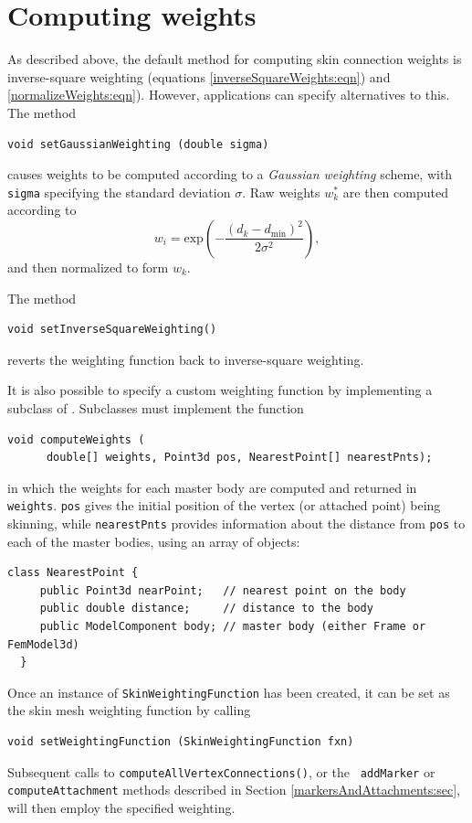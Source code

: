 \section{Computing weights}
\label{skinWeighting:sec}

As described above, the default method for computing skin connection
weights is inverse-square weighting (equations \ref{inverseSquareWeights:eqn})
and \ref{normalizeWeights:eqn}). However, applications can specify
alternatives to this. The method
%
\begin{lstlisting}[]
  void setGaussianWeighting (double sigma)
\end{lstlisting}
%
causes weights to be computed according to a {\it Gaussian weighting}
scheme, with {\tt sigma} specifying the standard deviation $\sigma$.
Raw weights $w^*_k$ are then computed according to
%
\begin{equation*}
w_i = \text{exp} \left( -\frac{(d_k - d_\text{min})^2}{2 \sigma^2} \right),
\end{equation*}
%
and then normalized to form $w_k$.

The method
%
\begin{lstlisting}[]
  void setInverseSquareWeighting()
\end{lstlisting}
%
reverts the weighting function back to inverse-square weighting.

It is also possible to specify a custom weighting function
by implementing a subclass of 
.
Subclasses must implement the function
%
\begin{lstlisting}[]
  void computeWeights (
      double[] weights, Point3d pos, NearestPoint[] nearestPnts);
\end{lstlisting}
%
in which the weights for each master body are computed and returned in
{\tt weights}. {\tt pos} gives the initial position of the vertex (or
attached point) being skinning, while {\tt nearestPnts} provides
information about the distance from {\tt pos} to each of the master
bodies, using an array of
objects:
%
\begin{lstlisting}[]
  class NearestPoint {
     public Point3d nearPoint;   // nearest point on the body
     public double distance;     // distance to the body
     public ModelComponent body; // master body (either Frame or FemModel3d)
  }
\end{lstlisting}
%

Once an instance of {\tt SkinWeightingFunction} has been created,
it can be set as the skin mesh weighting function by calling
%
\begin{lstlisting}[]
  void setWeightingFunction (SkinWeightingFunction fxn)
\end{lstlisting}
%
Subsequent calls to {\tt computeAllVertexConnections()}, or the {\tt
addMarker} or {\tt computeAttachment} methods described in Section
\ref{markersAndAttachments:sec}, will then employ the specified
weighting.

